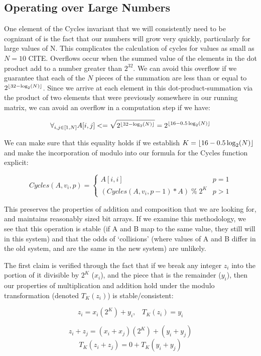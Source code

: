 \subsection{Operating over Large Numbers}
One element of the Cycles invariant that we will consistently need to be cognizant of is the fact that our numbers will grow very quickly, particularly for large values of N.
This complicates the calculation of cycles for values as small as $N=10$ CITE.
Overflows occur when the summed value of the elements in the dot product add to a number greater than $2^32$.
We can avoid this overflow if we guarantee that each of the $N$ pieces of the summation are less than or equal to $2^{\lfloor32 - \log_2(N)\rfloor}$.
Since we arrive at each element in this dot-product-summation via the product of two elements that were previously somewhere in our running matrix, we can avoid an overflow in a computation step if we have:

$$ \forall_{i, j \in [1, N]} A[i, j] <= \sqrt{2^{\lfloor32 - \log_2(N)\rfloor}} = 2^{\lfloor16 - 0.5\log_2(N)\rfloor}$$

We can make sure that this equality holds if we establish $K = \lfloor16 - 0.5\log_2(N)\rfloor$ and make the incorporation of modulo into our formula for the Cycles function explicit:

$$ Cycles(A, v_i, p) = \begin{cases} 
      A[i,i] & p = 1 \\
      (Cycles(A, v_i, p-1) * A) \; \% \; 2^K  & p > 1
\end{cases}$$

This preserves the properties of addition and composition that we are looking for, and maintains reasonably sized bit arrays.
If we examine this methodology, we see that this operation is stable (if A and B map to the same value, they still will in this system) and that the odds of `collisions' (where values of A and B differ in the old system, and are the same in the new system) are unlikely.

The first claim is verified through the fact that if we break any integer $z_i$ into the portion of it divisible by $2^K$ ($x_i$), and the piece that is the remainder ($y_i$), then our properties of multiplication and addition hold under the modulo transformation (denoted $T_K(z_i)$) is stable/consistent:

$$z_i =  x_i(2^K) + y_i , \;\;\;T_K(z_i) = y_i$$

$$z_i + z_j = (x_i + x_j)(2^K) + (y_i + y_j)$$
$$T_K(z_i + z_j) = 0 + T_K(y_i + y_j)$$

